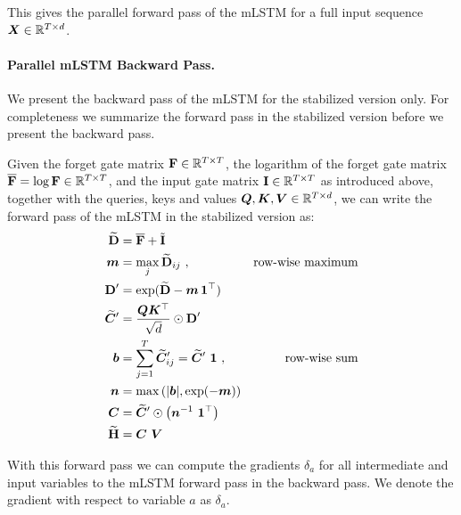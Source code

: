 \documentclass[dvipsnames]{article}
\begin{document}
\begin{appendix}
This gives the parallel forward pass of the mLSTM for a full input sequence $\bm{X} \in \mathbb{R}^{T \times d}$.

\paragraph{Parallel mLSTM Backward Pass.}

We present the backward pass of the mLSTM for the stabilized version only.
For completeness we summarize the forward pass in the stabilized version before we present the backward pass. 

Given the forget gate matrix $\bm{\mathrm{F}} \in \mathbb{R}^{T \times T}$, 
the logarithm of the forget gate matrix $\overline{\bm{\mathrm{F}}} = \log \bm{\mathrm{F}} \in \mathbb{R}^{T \times T}$, 
and the input gate matrix $\bm{\mathrm{I}} \in \mathbb{R}^{T \times T}$ as introduced above,
together with the queries, keys and values $\bm{Q}, \bm{K}, \bm{V} \in \mathbb{R}^{T \times d}$, we can write the forward pass of the mLSTM 
in the stabilized version as:
\begin{alignat}{2}
    \widetilde{\bm{\rD}} &= \overline{\bm{\rF}} + \tilde{\bm{\rI}} \\
    \Bm &= \max_j \widetilde{\bm{\rD}}_{ij} \ , \quad &\text{row-wise maximum} \\
    \bm{\rD}' &= \exp(\widetilde{\bm{\rD}} - \Bm \, \BOn^\top) \\
    \widetilde{\BC}' &= \frac{\BQ \BK^\top}{\sqrt{d}} \odot \bm{\rD}' \\
    \Bb &= \sum_{j=1}^{T} \widetilde{\BC}'_{ij} = \widetilde{\BC}' \ \BOn \ , \quad &\text{row-wise sum} \\ 
    \Bn &= \max \left( |\Bb|, \exp(-\Bm) \right) \\
    \BC &= \widetilde{\BC}' \odot \left( \Bn^{-1} \ \BOn^\top \right) \\
    \widetilde{\bm{\rH}} &= \BC \ \BV
\end{alignat}

With this forward pass we can compute the gradients $\delta_a$ for all intermediate and input variables to the mLSTM forward pass 
in the backward pass. We denote the gradient with respect to variable $a$ as $\delta_a$.


\end{appendix}
\end{document}
